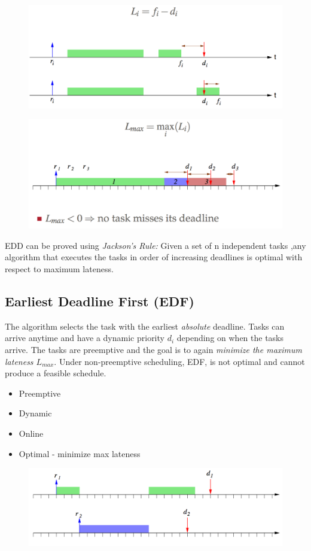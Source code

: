 \documentclass{hw}
\begin{document}
\begin{figure}[H]
  \centering
  \includegraphics[scale=.6]{edd}
\end{figure}
\begin{figure}[H]
  \centering
  \includegraphics[scale=.6]{edd2}
\end{figure}
EDD can be proved using \emph{Jackson's Rule:} Given a set of n independent tasks
,any algorithm that executes the tasks in order of increasing deadlines is optimal
with respect to maximum lateness.

\subsection{Earliest Deadline First (EDF)}
The algorithm selects the task with the earliest \emph{absolute} deadline. Tasks
can arrive anytime and have a dynamic priority $d_{i}$ depending on when the 
tasks arrive. The tasks are preemptive and the goal is to again \emph{minimize 
the maximum lateness $L_{max}$}. Under non-preemptive scheduling, EDF, is not
optimal and cannot produce a feasible schedule.
\begin{itemize}
  \item Preemptive
  \item Dynamic
  \item Online
  \item Optimal - minimize max lateness
\end{itemize}
\begin{figure}[H]
  \centering
  \includegraphics[scale=.6]{edf}
\end{figure}
\end{document}
